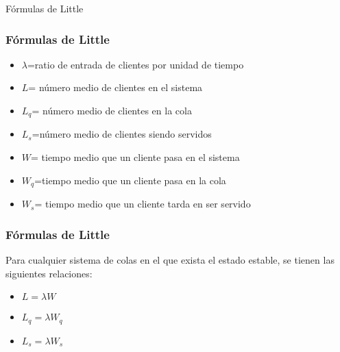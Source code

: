 
\begin{frame}
	\centering \LARGE \color{naranjaUCA} Fórmulas de Little
\end{frame}
\begin{frame}\frametitle{Fórmulas de Little}
	\pause
	\begin{itemize}
		\item $\lambda$=ratio de entrada de clientes por unidad de tiempo \pause
		\item$L$= n\'umero medio de clientes en el sistema \pause
		\item$L_q$= n\'umero medio de clientes en la cola \pause
		\item$L_s$=n\'umero medio de clientes siendo servidos \pause
		\item$W$= tiempo medio que un cliente pasa en el sistema \pause
		\item$W_q$=tiempo medio que un cliente pasa en la cola \pause
		\item$W_s$= tiempo medio que un cliente tarda en ser servido \pause
	\end{itemize}
\end{frame}

\begin{frame}\frametitle{Fórmulas de Little}
	
	Para cualquier sistema de colas en el que exista el estado estable, se tienen las siguientes relaciones:
	 \pause
	\begin{itemize}
		\item $L=\lambda W$
		\pause
		\item$L_q=\lambda W_q$
		\pause
		\item$L_s=\lambda W_s$
		\pause
	\end{itemize}
\end{frame}
